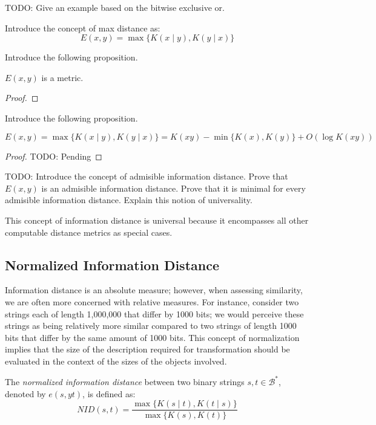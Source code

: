 \begin{example}
{\color{red} TODO: Give an example based on the bitwise exclusive or.}
\end{example}

{\color{red} Introduce the concept of max distance as:}
\[
E(x, y) = \max\{ K(x \mid y), K(y \mid x) \}
\]

{\color{red} Introduce the following proposition.}

\begin{proposition}
{\color{red} $E(x, y)$ is a metric.}
\end{proposition}
\begin{proof}
\end{proof}

{\color{red} Introduce the following proposition.}

\begin{proposition}
\[
E(x, y) = \max\{ K(x \mid y), K(y \mid x) \} = K(xy) - \min\{ K(x), K(y) \} + O(\log K(xy) )
\]
\end{proposition}
\begin{proof}
{\color{red} TODO: Pending}
\end{proof}

{\color{red} TODO: Introduce the concept of admisible information distance. Prove that $E(x, y)$ is an admisible information distance. Prove that it is minimal for every admisible information distance. Explain this notion of universality.}

{\color{red} This concept of information distance is universal because it encompasses all other computable distance metrics as special cases.}

\subsection*{Normalized Information Distance}

Information distance is an absolute measure; however, when assessing similarity, we are often more concerned with relative measures. For instance, consider two strings each of length 1,000,000 that differ by 1000 bits; we would perceive these strings as being relatively more similar compared to two strings of length 1000 bits that differ by the same amount of 1000 bits. This concept of normalization implies that the size of the description required for transformation should be evaluated in the context of the sizes of the objects involved.

\begin{definition}
The \emph{normalized information distance} between two binary strings $s,  t \in \mathcal{B}^{\ast}$, denoted by $e(s, yt)$, is defined as:
\[
NID(s, t) = \frac{\max\{ K(s \mid t), K(t \mid s) \}}{\max \{ K(s), K(t) \} }
\]
\end{definition}


